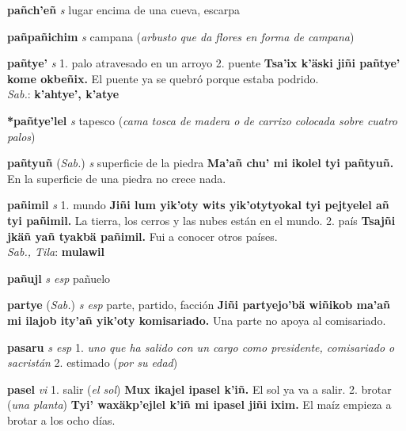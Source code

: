 \documentclass[10pt]{scrbook}
\newcommand{\entry}[1]{\textbf{#1}}
\newcommand{\onedefinition}[1]{#1.}
\newcommand{\nontranslationdef}[1]{\textit{#1}}
\newcommand{\partofspeech}[1]{\textit{#1}}
\newcommand{\spanishtranslation}[1]{#1}
\newcommand{\clarification}[1]{(\textit{#1})}
\newcommand{\cholexample}[1]{\textbf{#1}}
\newcommand{\exampletranslation}[1]{#1}
\newcommand{\dialectvariant}[1]{\\\textit{#1}:}
\newcommand{\dialectword}[1]{\textbf{#1}}
\newcommand{\relevantdialect}[1]{(\textit{#1})}
\begin{document}
\begin{multicols}{2}
\entry{pañch'eñ}
\partofspeech{s}
\spanishtranslation{lugar encima de una cueva, escarpa}

\entry{pañpañichim}
\partofspeech{s}
\spanishtranslation{campana}
\clarification{arbusto que da flores en forma de campana}

\entry{pañtye'}
\partofspeech{s}
\onedefinition{1}
\spanishtranslation{palo atravesado en un arroyo}
\onedefinition{2}
\spanishtranslation{puente}
\cholexample{Tsa'ix k'äski jiñi pañtye' kome okbeñix.}
\exampletranslation{El puente ya se quebró porque estaba podrido.}
\dialectvariant{Sab.}
\dialectword{k'ahtye', k'atye}

\entry{*pañtye'lel}
\partofspeech{s}
\spanishtranslation{tapesco}
\clarification{cama tosca de madera o de carrizo colocada sobre cuatro palos}

\entry{pañtyuñ}
\relevantdialect{Sab.}
\partofspeech{s}
\spanishtranslation{superficie de la piedra}
\cholexample{Ma'añ chu' mi ikolel tyi pañtyuñ.}
\exampletranslation{En la superficie de una piedra no crece nada.}

\entry{pañimil}
\partofspeech{s}
\onedefinition{1}
\spanishtranslation{mundo}
\cholexample{Jiñi lum yik'oty wits yik'otytyokal tyi pejtyelel añ tyi pañimil.}
\exampletranslation{La tierra, los cerros y las nubes están en el mundo.}
\onedefinition{2}
\spanishtranslation{país}
\cholexample{Tsajñi jkäñ yañ tyakbä pañimil.}
\exampletranslation{Fui a conocer otros países.}
\dialectvariant{Sab., Tila}
\dialectword{mulawil}

\entry{pañujl}
\partofspeech{s esp}
\spanishtranslation{pañuelo}

\entry{partye}
\relevantdialect{Sab.}
\partofspeech{s esp}
\spanishtranslation{parte, partido, facción}
\cholexample{Jiñi partyejo'bä wiñikob ma'añ mi ilajob ity'añ yik'oty komisariado.}
\exampletranslation{Una parte no apoya al comisariado.}

\entry{pasaru}
\partofspeech{s esp}
\onedefinition{1}
\nontranslationdef{uno que ha salido con un cargo como presidente, comisariado o sacristán}
\onedefinition{2}
\spanishtranslation{estimado}
\clarification{por su edad}

\entry{pasel}
\partofspeech{vi}
\onedefinition{1}
\spanishtranslation{salir}
\clarification{el sol}
\cholexample{Mux ikajel ipasel k'iñ.}
\exampletranslation{El sol ya va a salir.}
\onedefinition{2}
\spanishtranslation{brotar}
\clarification{una planta}
\cholexample{Tyi' waxäkp'ejlel k'iñ mi ipasel jiñi ixim.}
\exampletranslation{El maíz empieza a brotar a los ocho días.}


\end{multicols}
\end{document}
